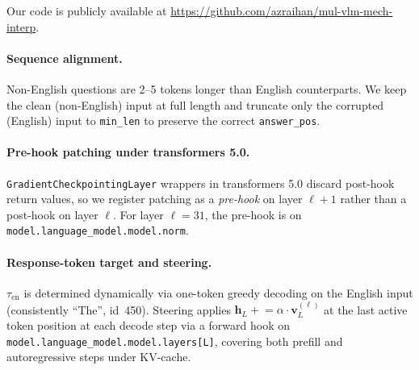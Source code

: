 \documentclass[11pt]{article}
\begin{document}
Our code is publicly available at \url{https://github.com/azraihan/mul-vlm-mech-interp}.

\paragraph{Sequence alignment.}
Non-English questions are 2--5 tokens longer than English counterparts.
We keep the clean (non-English) input at full length and truncate only the
corrupted (English) input to \texttt{min\_len} to preserve the correct
\texttt{answer\_pos}.

\paragraph{Pre-hook patching under transformers 5.0.}
\texttt{GradientCheckpointingLayer} wrappers in transformers 5.0 discard
post-hook return values, so we register patching as a \emph{pre-hook} on
layer $\ell{+}1$ rather than a post-hook on layer $\ell$.
For layer $\ell{=}31$, the pre-hook is on
\texttt{model.language\_model.model.norm}.

\paragraph{Response-token target and steering.}
\label{app:steering}
$\tau_\mathrm{en}$ is determined dynamically via one-token greedy decoding on
the English input (consistently ``The'', id~450).
Steering applies $\mathbf{h}_L \mathrel{+}= \alpha \cdot \mathbf{v}_L^{(\ell)}$
at the last active token position at each decode step via a forward hook on
\texttt{model.language\_model.model.layers[L]}, covering both prefill and
autoregressive steps under KV-cache.
\end{document}

